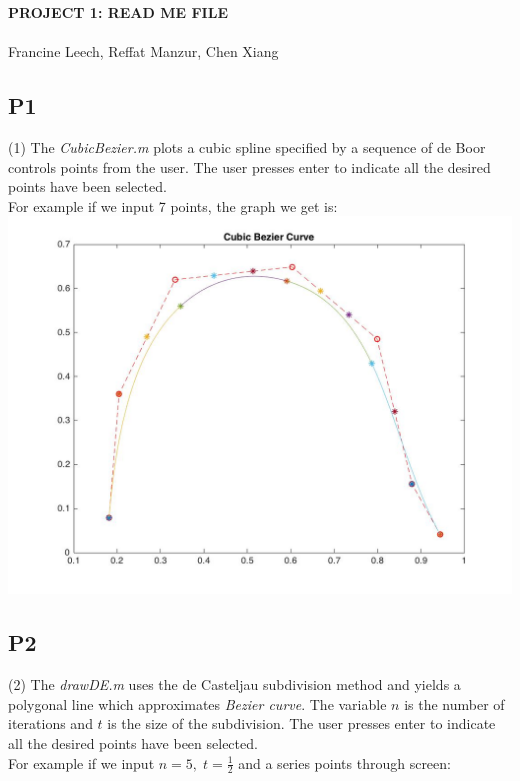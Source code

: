 \documentclass[12pt]{article}
\begin{document}
{\Large\bf PROJECT 1: READ ME FILE \\
\vspace{0.5cm}}\\[10pt]
Francine Leech, Reffat Manzur, Chen Xiang 

\subsection*{P1}
(1) 
The \textit{CubicBezier.m} plots a cubic spline specified by a sequence of de Boor controls points from the user. The user presses enter to indicate all the desired points have been selected. 
\\
For example if we input 7 points, the graph we get is:\\ 
\includegraphics[scale=.25]{CubicGraph}

\subsection*{P2}
(2) 
The \textit{drawDE.m} uses the de Casteljau subdivision method and  yields a polygonal line which approximates \textit{Bezier curve}. The variable $n$ is the number of iterations and $t$ is the size of the subdivision. The user presses enter to indicate all the desired points have been selected. 
\\
For example if we input $n = 5 , \; t = \frac{1}{2}$ and a series points through screen: 
\end{document}

